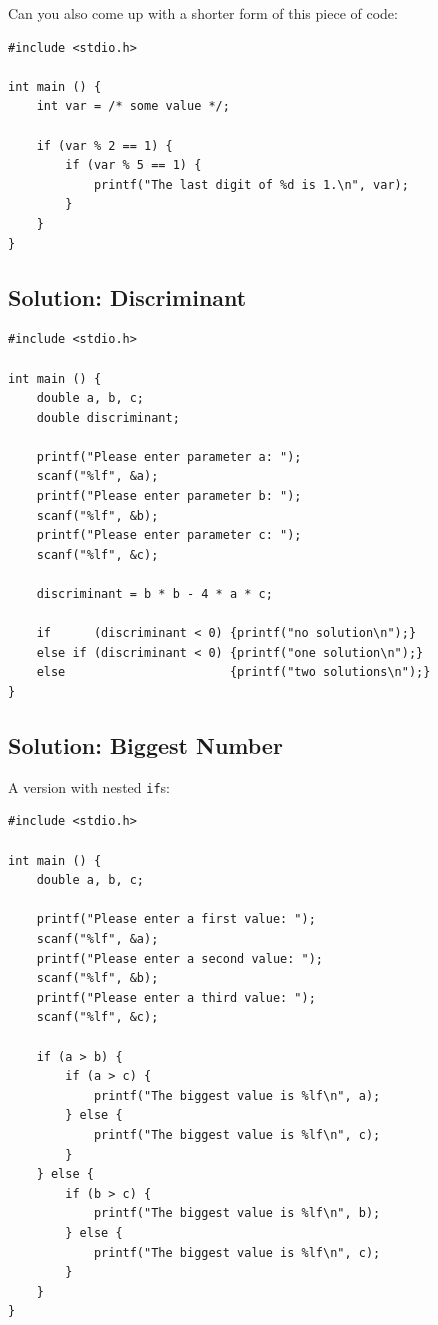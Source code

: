 Can you also come up with a shorter form of this piece of code:
\begin{codebox}
\begin{verbatim}
#include <stdio.h>

int main () {
    int var = /* some value */;

    if (var % 2 == 1) {
        if (var % 5 == 1) {
            printf("The last digit of %d is 1.\n", var);
        }
    }
}
\end{verbatim}
\end{codebox}


\newpage


\subsection*{Solution: Discriminant}
\begin{codebox}[exo5-1.c]
\begin{verbatim}
#include <stdio.h>

int main () {
    double a, b, c;
    double discriminant;
    
    printf("Please enter parameter a: ");
    scanf("%lf", &a);
    printf("Please enter parameter b: ");
    scanf("%lf", &b);
    printf("Please enter parameter c: ");
    scanf("%lf", &c);
    
    discriminant = b * b - 4 * a * c;
    
    if      (discriminant < 0) {printf("no solution\n");}
    else if (discriminant < 0) {printf("one solution\n");}
    else                       {printf("two solutions\n");}
}
\end{verbatim}
\end{codebox}


\subsection*{Solution: Biggest Number}
A version with nested \texttt{if}s:
\begin{codebox}[exo5-2a.c]
\begin{verbatim}
#include <stdio.h>

int main () {
    double a, b, c;
    
    printf("Please enter a first value: ");
    scanf("%lf", &a);
    printf("Please enter a second value: ");
    scanf("%lf", &b);
    printf("Please enter a third value: ");
    scanf("%lf", &c);
    
    if (a > b) {
        if (a > c) {
            printf("The biggest value is %lf\n", a);
        } else {
            printf("The biggest value is %lf\n", c);
        }
    } else {
        if (b > c) {
            printf("The biggest value is %lf\n", b);
        } else {
            printf("The biggest value is %lf\n", c);
        }
    }
}
\end{verbatim}
\end{codebox}

